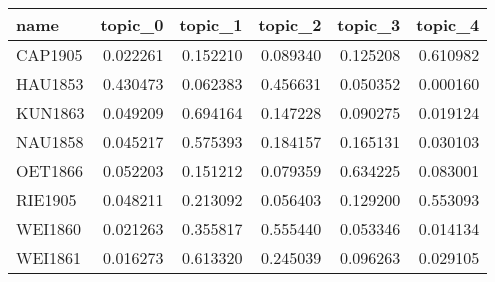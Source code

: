 \begin{tabular}{lrrrrr}
\toprule
   name &  topic\_0 &  topic\_1 &  topic\_2 &  topic\_3 &  topic\_4 \\
\midrule
CAP1905 & 0.022261 & 0.152210 & 0.089340 & 0.125208 & 0.610982 \\
HAU1853 & 0.430473 & 0.062383 & 0.456631 & 0.050352 & 0.000160 \\
KUN1863 & 0.049209 & 0.694164 & 0.147228 & 0.090275 & 0.019124 \\
NAU1858 & 0.045217 & 0.575393 & 0.184157 & 0.165131 & 0.030103 \\
OET1866 & 0.052203 & 0.151212 & 0.079359 & 0.634225 & 0.083001 \\
RIE1905 & 0.048211 & 0.213092 & 0.056403 & 0.129200 & 0.553093 \\
WEI1860 & 0.021263 & 0.355817 & 0.555440 & 0.053346 & 0.014134 \\
WEI1861 & 0.016273 & 0.613320 & 0.245039 & 0.096263 & 0.029105 \\
\bottomrule
\end{tabular}
